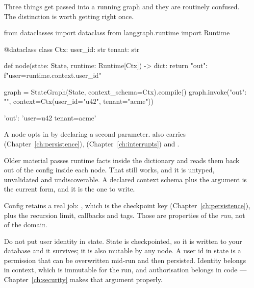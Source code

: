 Three things get passed into a running graph and they are routinely confused. The
distinction is worth getting right once.


\begin{python}[caption={Runtime context, typed}, label={lst:runtime}]
from dataclasses import dataclass
from langgraph.runtime import Runtime


@dataclass
class Ctx:
    user_id: str
    tenant: str


def node(state: State, runtime: Runtime[Ctx]) -> dict:
    return {"out": f"user={runtime.context.user_id}"}


graph = StateGraph(State, context_schema=Ctx).compile()
graph.invoke({"out": ""}, context=Ctx(user_id="u42", tenant="acme"))
\end{python}

\begin{console}
{'out': 'user=u42 tenant=acme'}
\end{console}

A node opts in by declaring a second parameter.  also carries
 (Chapter~\ref{ch:persistence}), 
(Chapter~\ref{ch:interrupts}) and .

\begin{versionbox}
Older material passes runtime facts inside the  dictionary and
reads them back out of the config inside each node. That still works, and it is
untyped, unvalidated and undiscoverable. A declared context schema plus the
 argument is the current form, and it is the one to write.

Config retains a real job: , which is the checkpoint key
(Chapter~\ref{ch:persistence}), plus the recursion limit, callbacks and tags.
Those are properties of the \emph{run}, not of the domain.
\end{versionbox}

\begin{warning}
Do not put user identity in state. State is checkpointed, so it is written to
your database and it survives; it is also mutable by any node. A user id in state
is a permission that can be overwritten mid-run and then persisted. Identity
belongs in context, which is immutable for the run, and authorisation belongs in
code --- Chapter~\ref{ch:security} makes that argument properly.
\end{warning}

